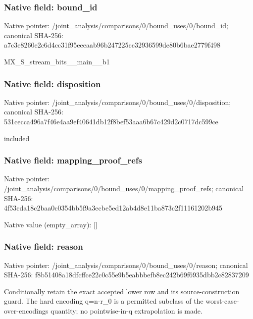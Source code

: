 \documentclass[10pt,a4paper]{article}
\begin{document}
\subsubsection{Native field: bound\_\allowbreak{}id}
Native pointer: /joint\_\allowbreak{}analysis/comparisons/0/bound\_\allowbreak{}uses/0/bound\_\allowbreak{}id; canonical SHA-256: a7c3e8260e2c6d4cc31f95eeeaab96b247225cc32936599de80b6bae2779f498

\begingroup\raggedright\sloppy MX\_\allowbreak{}S\_\allowbreak{}stream\_\allowbreak{}bits\_\allowbreak{}\_\allowbreak{}main\_\allowbreak{}\_\allowbreak{}b1\par\endgroup

\subsubsection{Native field: disposition}
Native pointer: /joint\_\allowbreak{}analysis/comparisons/0/bound\_\allowbreak{}uses/0/disposition; canonical SHA-256: 531cecca496a7f46e4aa9ef40641db12f8bef53aaa6b67c429d2c0717dc599ce

\begingroup\raggedright\sloppy included\par\endgroup

\subsubsection{Native field: mapping\_\allowbreak{}proof\_\allowbreak{}refs}
Native pointer: /joint\_\allowbreak{}analysis/comparisons/0/bound\_\allowbreak{}uses/0/mapping\_\allowbreak{}proof\_\allowbreak{}refs; canonical SHA-256: 4f53cda18c2baa0c0354bb5f9a3ecbe5ed12ab4d8e11ba873c2f11161202b945

Native value (empty\_\allowbreak{}array): []

\subsubsection{Native field: reason}
Native pointer: /joint\_\allowbreak{}analysis/comparisons/0/bound\_\allowbreak{}uses/0/reason; canonical SHA-256: f8b51408a18dfcffce22c0c55e9b5eabbbefb8ec242b69f6935dbb2c82837209

\begingroup\raggedright\sloppy Conditionally retain the exact accepted lower row and its source-construction guard. The hard encoding q=\allowbreak{}n-r\_\allowbreak{}0 is a permitted subclass of the worst-case-over-encodings quantity;\allowbreak{} no pointwise-in-q extrapolation is made.\par\endgroup
\end{document}
